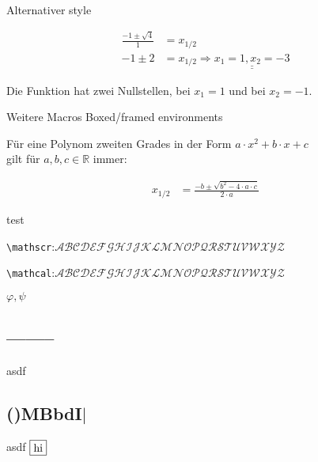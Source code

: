 \documentclass[
    ngerman,
    color=1b,
    submission,
    submission,
    dark_mode,
    boxarc,
    fleqn,
]{rubos-tuda-template}
\begin{document}
\begin{task}[points=auto,solution=true]{Alternativer style}
\begin{subtask}[title={Irgend son Graph},points=2]
\begin{solution}
\begin{align*}
                    \frac{-1\pm \sqrt{4}}{1}                                        & =x_{1/2}                                                                                                                                                     \\
                    -1 \pm 2                                                        & =x_{1/2} \Rightarrow \underline{\underline{x_1                                       = 1, x_2=-3}}
                \end{align*}
                \begin{grayInfoBox}
                    \antwort Die Funktion hat zwei Nullstellen, bei $x_1=1$ und bei $x_2=-1$.
                \end{grayInfoBox}
            \end{solution}
        \end{subtask}
    \end{task}
    \clearpage
    \begin{task}[points=2,solution=true]{Weitere Macros}
        Boxed/framed environments
        \begin{definition}[Mitternachtsformel] Für eine Polynom zweiten Grades in der Form $a\cdot x^2+b\cdot x + c$ \\gilt für $a,b,c \in \mathbb{R}$ immer:%

            \begin{align}
                x_{1/2} & =\frac{-b\pm\sqrt{b^{2}-4\cdot a \cdot c}}{2\cdot a}
            \end{align}

        \end{definition}
        \begin{definition}
            test
        \end{definition}
        \verb+\mathscr+:$\mathscr{ABCDEFGHIJKLMNOPQRSTUVWXYZ}$

        \verb+\mathcal+:$\mathcal{ABCDEFGHIJKLMNOPQRSTUVWXYZ}$

        $\varphi, \psi$

        \begin{minipage}[t]{.5\textwidth-1pt}
            \subsection{--------} %
            asdf
        \end{minipage}\hspace{2pt}%
        \begin{minipage}[t]{.5\textwidth-1pt}
            \subsection{\texorpdfstring{()MBbdI$\vert$}{()MBbdI|}} %
            asdf $\vcenter{\hbox{\tikz{\node[draw]{hi};}}}$
        \end{minipage}
    \end{task}
\end{document}
